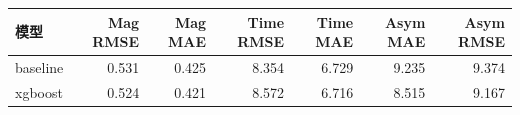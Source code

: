 \begingroup
\footnotesize
\setlength{\tabcolsep}{4pt}
\begin{tabular}{p{}rrrrrr}
\toprule
模型 & Mag RMSE & Mag MAE & Time RMSE & Time MAE & Asym MAE & Asym RMSE \\
\midrule
baseline & 0.531 & 0.425 & 8.354 & 6.729 & 9.235 & 9.374 \\
xgboost & 0.524 & 0.421 & 8.572 & 6.716 & 8.515 & 9.167 \\
\bottomrule
\end{tabular}
\endgroup
